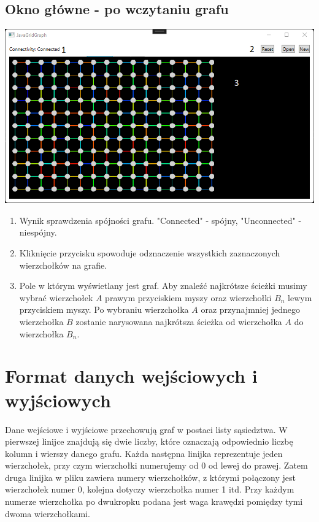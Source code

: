 \documentclass[11pt,a4paper]{report}
\begin{document}
    \subsection{Okno główne - po wczytaniu grafu}

    \includegraphics[width=\textwidth]{view3.png}

    \begin{enumerate}
        \item Wynik sprawdzenia spójności grafu. "Connected" - spójny, "Unconnected" - niespójny.
        \item Kliknięcie przycisku spowoduje odznaczenie wszystkich zaznaczonych wierzchołków na grafie.
        \item Pole w którym wyświetlany jest graf. Aby znaleźć najkrótsze ścieżki musimy wybrać wierzchołek $A$ prawym przyciskiem myszy oraz wierzchołki $B_n$ lewym przyciskiem myszy. Po wybraniu wierzchołka $A$ oraz przynajmniej jednego wierzchołka $B$ zostanie narysowana najkrótsza ścieżka od wierzchołka $A$ do wierzchołka $B_n$.
    \end{enumerate}




    \newpage
    \section{Format danych wejściowych i wyjściowych}
    Dane wejściowe i wyjściowe przechowują graf w postaci listy sąsiedztwa. W pierwszej linijce znajdują się dwie liczby, które oznaczają odpowiednio liczbę kolumn i wierszy danego grafu. Każda następna linijka reprezentuje jeden wierzchołek, przy czym wierzchołki numerujemy od 0 od lewej do prawej. Zatem druga linijka w pliku zawiera numery wierzchołków, z którymi połączony jest wierzchołek numer 0, kolejna dotyczy wierzchołka numer 1 itd. Przy każdym numerze wierzchołka po dwukropku podana jest waga krawędzi pomiędzy tymi dwoma wierzchołkami.
\end{document}

